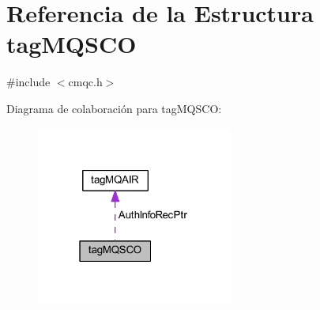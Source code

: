 \hypertarget{structtag_m_q_s_c_o}{}\section{Referencia de la Estructura tag\+M\+Q\+S\+C\+O}
\label{structtag_m_q_s_c_o}


{\ttfamily \#include $<$cmqc.\+h$>$}



Diagrama de colaboración para tag\+M\+Q\+S\+C\+O\+:\nopagebreak
\begin{figure}[H]
\begin{center}
\leavevmode
\includegraphics[width=183pt]{structtag_m_q_s_c_o__coll__graph}
\end{center}
\end{figure}
